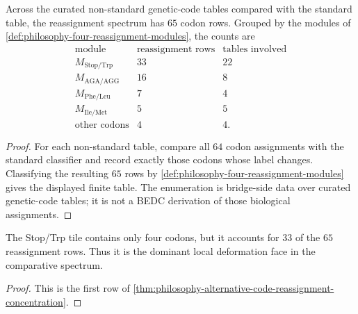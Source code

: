 \begin{theorem}
\label{thm:philosophy-alternative-code-reassignment-concentration}
Across the curated non-standard genetic-code tables compared with the
standard table, the reassignment spectrum has $65$ codon rows. Grouped
by the modules of \autoref{def:philosophy-four-reassignment-modules},
the counts are
$$
\begin{array}{c|r|r}
  \text{module} & \text{reassignment rows} & \text{tables involved}\\
\hline
  M_{\mathrm{Stop/Trp}} & 33 & 22\\
  M_{\mathrm{AGA/AGG}} & 16 & 8\\
  M_{\mathrm{Phe/Leu}} & 7 & 4\\
  M_{\mathrm{Ile/Met}} & 5 & 5\\
  \text{other codons} & 4 & 4.
\end{array}
$$
\end{theorem}
\begin{proof}
For each non-standard table, compare all $64$ codon assignments with
the standard classifier and record exactly those codons whose label
changes. Classifying the resulting $65$ rows by
\autoref{def:philosophy-four-reassignment-modules} gives the displayed
finite table. The enumeration is bridge-side data over curated
genetic-code tables; it is not a BEDC derivation of those biological
assignments.
\end{proof}

\begin{corollary}
\label{cor:philosophy-stop-trp-main-deformation-face}
The Stop/Trp tile contains only four codons, but it accounts for
$33$ of the $65$ reassignment rows. Thus it is the dominant local
deformation face in the comparative spectrum.
\end{corollary}
\begin{proof}
This is the first row of
\autoref{thm:philosophy-alternative-code-reassignment-concentration}.
\end{proof}

